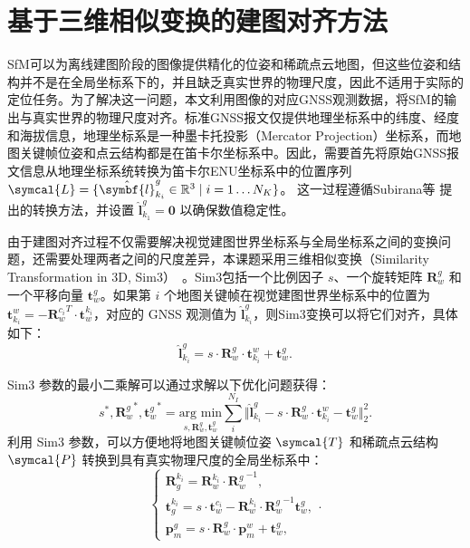 \section{基于三维相似变换的建图对齐方法}

SfM可以为离线建图阶段的图像提供精化的位姿和稀疏点云地图，但这些位姿和结构并不是在全局坐标系下的，并且缺乏真实世界的物理尺度，因此不适用于实际的定位任务。为了解决这一问题，本文利用图像的对应GNSS观测数据，将SfM的输出与真实世界的物理尺度对齐。标准GNSS报文仅提供地理坐标系中的纬度、经度和海拔信息，地理坐标系是一种墨卡托投影（Mercator Projection）坐标系，而地图关键帧位姿和点云结构都是在笛卡尔坐标系中。因此，需要首先将原始GNSS报文信息从地理坐标系统转换为笛卡尔ENU坐标系中的位置序列
$\symcal{L} = \{\hat{\symbf{l}}_{k_i}^g \in \mathbb{R}^3 \mid i=1 \ldots N_K \}$。
这一过程遵循Subirana等\cite{subirana2011transformations} 提出的转换方法，并设置
$\hat{\symbf{l}}_{k_1}^g = \symbf{0}$ 以确保数值稳定性。

由于建图对齐过程不仅需要解决视觉建图世界坐标系与全局坐标系之间的变换问题，还需要处理两者之间的尺度差异，本课题采用三维相似变换（Similarity Transformation in 3D, Sim3）~\cite{horn1987closed}。Sim3包括一个比例因子 $s$、一个旋转矩阵 $\symbf{R}_w^g$ 和一个平移向量 $\symbf{t}_w^g$。如果第 $i$ 个地图关键帧在视觉建图世界坐标系中的位置为 $\symbf{t}_{k_i}^{w} = -{\symbf{R}_w^{c_i}}^T \cdot \symbf{t}_w^{k_i}$，对应的 GNSS 观测值为 $\hat{\symbf{l}}_{k_i}^g$，则Sim3变换可以将它们对齐，具体如下：
\begin{equation}
  \hat{\symbf{l}}_{k_i}^g = s \cdot \symbf{R}_w^g \cdot \symbf{t}_{k_i}^{w} + \symbf{t}_w^g.
\end{equation}

Sim3 参数的最小二乘解可以通过求解以下优化问题获得：
\begin{equation}
  s^*, {\symbf{R}_w^g}^*, {\symbf{t}_w^g}^* = \underset{s,\symbf{R}_w^g,\symbf{t}_w^g}{\text{arg min}} \sum_i^{N_I} \Vert \hat{\symbf{l}}_{k_i}^g - s \cdot \symbf{R}_w^g \cdot \symbf{t}_{k_i}^{w} - \symbf{t}_w^g \Vert_2^2.
\end{equation}
利用 Sim3 参数，可以方便地将地图关键帧位姿 $\symcal{T}$ 和稀疏点云结构 $\symcal{P}$ 转换到具有真实物理尺度的全局坐标系中：
\begin{equation}
\begin{cases}
    \symbf{R}^{k_i}_g = {\symbf{R}^{k_i}_{w}} \cdot {\symbf{R}_w^g}^{-1}, \\
    \symbf{t}^{k_i}_g = s \cdot \symbf{t}_w^{c_i} - {\symbf{R}^{k_i}_{w}} \cdot {\symbf{R}^{g}_{w}}^{-1} \symbf{t}_w^g, \\
    \symbf{p}_m^g = s \cdot \symbf{R}_w^g \cdot \symbf{p}_{m}^{w} + \symbf{t}_w^g,
\end{cases}.
\end{equation}

